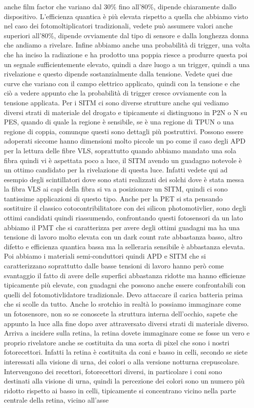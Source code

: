 anche film factor che variano dal 30\% fino all'80\%, dipende chiaramente dallo dispositivo. L'efficienza quantica è più elevata rispetto a quella che abbiamo visto nel caso dei fotomoltiplicatori tradizionali, vedete può assumere valori anche superiori all'80\%, dipende ovviamente dal tipo di sensore e dalla longhezza donna che andiamo a rivelare. Infine abbiamo anche una probabilità di trigger, una volta che ha inciso la radiazione e ha prodotto una poppia riesce a produrre questa poi un segnale sufficientemente elevato, quindi a dare luogo a un trigger, quindi a una rivelazione e questo dipende sostanzialmente dalla tensione. Vedete quei due curve che variano con il campo elettrico applicato, quindi con la tensione e che ciò a vedere appunto che la probabilità di trigger cresce ovviamente con la tensione applicata. Per i SITM ci sono diverse strutture anche qui vediamo diversi strati di materiale del drogato e tipicamente si distinguono in P2N o N su PES, quando di quale la regione è sensibile, se è una regione di TPUN o una regione di coppia, comunque questi sono dettagli più postruttivi. Possono essere adoperati siccome hanno dimensioni molto piccole un po come il caso degli APD per la lettura delle fibre VLS, soprattutto quando abbiamo mandato una sola fibra quindi vi è aspettata poco a luce, il SITM avendo un guadagno notevole è un ottimo candidato per la rivelazione di questa luce. Infatti vedete qui ad esempio degli scintillatori dove sono stati realizzati dei solchi dove è stata messa la fibra VLS ai capi della fibra si va a posizionare un SITM, quindi ci sono tantissime applicazioni di questo tipo. Anche per la PET si sta pensando sostituire il classico cotocontribilitatore con dei silicon photomotivlier, sono degli ottimi candidati quindi riassumendo, confrontando questi fotosensori da un lato abbiamo il PMT che si caratterizza per avere degli ottimi guadagni ma ha una tensione di lavoro molto elevata con un dark count rate abbastanza basso, altro difetto e efficienza quantica bassa ma la selleraria sensibile è abbastanza elevata. Poi abbiamo i materiali semi-conduttori quindi APD e SITM che si caratterizzano soprattutto dalle basse tensioni di lavoro hanno però come svantaggio il fatto di avere delle superfici abbastanza ridotte ma hanno efficienze tipicamente più elevate, con guadagni che possono anche essere confrontabili con quelli del fotomotivlidatore tradizionale. Devo attaccare il carica batteria prima che si scolle da tutto. Anche lo srotchio in realtà lo possiamo immaginare come un fotosensore, non so se conoscete la struttura interna dell'occhio, sapete che appunto la luce alla fine dopo aver attraversato diversi strati di materiale diverso. Arriva a incidere sulla retina, la retina dovete immaginare come se fosse un vero e proprio rivelatore anche se costituita da una sorta di pixel che sono i nostri fotorecettori. Infatti la retina è costituita da coni e basso in celli, secondo se siete interessati alla visione di urna, dei colori o alla versione notturna crepuscolare. Intervengono dei recettori, fotorecettori diversi, in particolare i coni sono destinati alla visione di urna, quindi la percezione dei colori sono un numero più ridotto rispetto ai basso in celli, tipicamente si concentrano vicino nella parte centrale della retina, vicino all'asse 